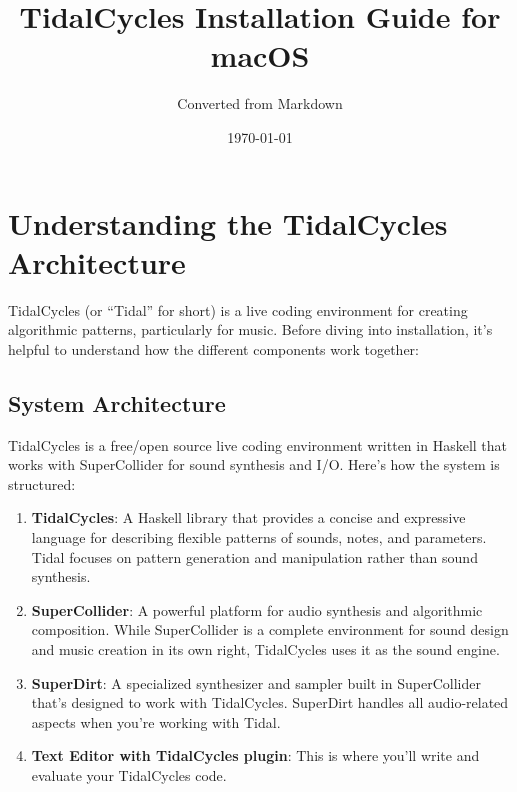 \documentclass[11pt,a4paper]{article}
\begin{document}
\title{TidalCycles Installation Guide for macOS}
\author{Converted from Markdown}
\date{\today}

\maketitle
\tableofcontents
\newpage

\section{Understanding the TidalCycles Architecture}

TidalCycles (or ``Tidal'' for short) is a live coding environment for creating algorithmic patterns, particularly for music. Before diving into installation, it's helpful to understand how the different components work together:

\subsection{System Architecture}

TidalCycles is a free/open source live coding environment written in Haskell that works with SuperCollider for sound synthesis and I/O. Here's how the system is structured:

\begin{enumerate}
    \item \textbf{TidalCycles}: A Haskell library that provides a concise and expressive language for describing flexible patterns of sounds, notes, and parameters. Tidal focuses on pattern generation and manipulation rather than sound synthesis.
    
    \item \textbf{SuperCollider}: A powerful platform for audio synthesis and algorithmic composition. While SuperCollider is a complete environment for sound design and music creation in its own right, TidalCycles uses it as the sound engine.
    
    \item \textbf{SuperDirt}: A specialized synthesizer and sampler built in SuperCollider that's designed to work with TidalCycles. SuperDirt handles all audio-related aspects when you're working with Tidal.
    
    \item \textbf{Text Editor with TidalCycles plugin}: This is where you'll write and evaluate your TidalCycles code.
\end{enumerate}
\end{document}
